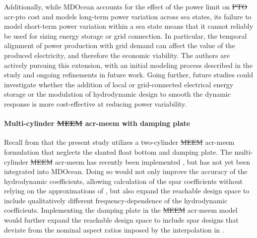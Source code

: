 \documentclass[a4paper,fleqn,colorlinks,unicode,lineno]{cas-dc} %
\makeatletter
\providecommand{\DIFdeltex}[1]{{\protect\color{red}\sout{#1}}} %
\providecommand{\DIFaddbegin}{} %
\providecommand{\DIFaddend}{} %
\providecommand{\DIFdelbegin}{} %
\providecommand{\DIFdelend}{} %
\providecommand{\DIFdel}[1]{\texorpdfstring{\DIFdeltex{#1}}{}} %
\providecommand{\DIFscaledelfig}{0.5}
\newlength{\DIFdelgraphicswidth} %
\newlength{\DIFdelgraphicsheight} %
\providecommand{\DIFaddincludegraphics}[2][]{{\color{blue}\fbox{\DIFOincludegraphics[#1]{#2}}}} %
\providecommand{\DIFdelincludegraphics}[2][]{%
\sbox{\DIFdelgraphicsbox}{\DIFOincludegraphics[#1]{#2}}%
\settoboxwidth{\DIFdelgraphicswidth}{\DIFdelgraphicsbox} %
\settoboxtotalheight{\DIFdelgraphicsheight}{\DIFdelgraphicsbox} %
\scalebox{\DIFscaledelfig}{%
\parbox[b]{\DIFdelgraphicswidth}{\usebox{\DIFdelgraphicsbox}\\[-\baselineskip] \rule{\DIFdelgraphicswidth}{0em}}\llap{\resizebox{\DIFdelgraphicswidth}{\DIFdelgraphicsheight}{%
\setlength{\unitlength}{\DIFdelgraphicswidth}%
\begin{picture}(1,1)%
\thicklines\linethickness{2pt} %
{\color[rgb]{1,0,0}\put(0,0){\framebox(1,1){}}}%
{\color[rgb]{1,0,0}\put(0,0){\line( 1,1){1}}}%
{\color[rgb]{1,0,0}\put(0,1){\line(1,-1){1}}}%
\end{picture}%
}\hspace*{3pt}}} %
} %
\DeclareRobustCommand{\DIFaddbegin}{\DIFOaddbegin \let\includegraphics\DIFaddincludegraphics} %
\DeclareRobustCommand{\DIFaddend}{\DIFOaddend \let\includegraphics\DIFOincludegraphics} %
\DeclareRobustCommand{\DIFdelbegin}{\DIFOdelbegin \let\includegraphics\DIFdelincludegraphics} %
\DeclareRobustCommand{\DIFdelend}{\DIFOaddend \let\includegraphics\DIFOincludegraphics} %
\let\sout@orig\sout %
\renewcommand{\sout}[1]{\ifmmode\text{\sout@orig{\ensuremath{#1}}}\else\sout@orig{#1}\fi} %
\makeatother
\begin{document}
    Additionally, while MDOcean accounts for the effect of the power limit on \DIFdelbegin \DIFdel{PTO }\DIFdelend \DIFaddbegin \gls{acr-pto} \DIFaddend cost and models long-term power variation across sea states, its failure to model short-term power variation within a sea state means that it cannot reliably be used for sizing energy storage or grid connection.
    In particular, the temporal alignment of power production with grid demand can affect the value of the produced electricity, and therefore the economic viability.
    The authors are actively pursuing this extension, with an initial modeling process described in the study \citep{mccabe_wec_2025} and ongoing refinements in future work.
    Going further, future studies could investigate whether the addition of local or grid-connected electrical energy storage or the modulation of hydrodynamic design to smooth the dynamic response is more cost-effective at reducing power variability.

    \paragraph{Multi-cylinder \DIFdelbegin \DIFdel{MEEM }\DIFdelend \DIFaddbegin \gls{acr-meem} \DIFaddend with damping plate}
    Recall from  that the present study utilizes a two-cylinder \DIFdelbegin \DIFdel{MEEM }\DIFdelend \DIFaddbegin \gls{acr-meem} \DIFaddend formulation that neglects the slanted float bottom and damping plate.
    The multi-cylinder \DIFdelbegin \DIFdel{MEEM }\DIFdelend \DIFaddbegin \gls{acr-meem} \DIFaddend has recently been implemented \citep{best_openflash_2026,bimali_matrix_2026}, but has not yet been integrated into MDOcean.
    Doing so would not only improve the accuracy of the hydrodynamic coefficients, allowing calculation of the spar coefficients without relying on the approximations of , but also expand the reachable design space to include qualitatively different frequency-dependence of the hydrodynamic coefficients.
    Implementing the damping plate in the \DIFdelbegin \DIFdel{MEEM }\DIFdelend \DIFaddbegin \gls{acr-meem} \DIFaddend model would further expand the reachable design space to include spar designs that deviate from the nominal aspect ratios imposed by the interpolation in .
\end{document}
